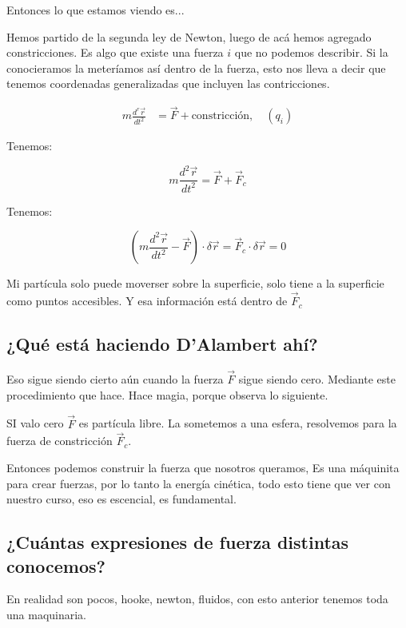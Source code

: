 \documentclass{article}
\begin{document}
Entonces lo que estamos viendo es...

Hemos partido de la segunda ley de Newton, luego de acá hemos agregado constricciones. Es algo que existe una fuerza $i$ que no podemos describir. Si la conocieramos la meteríamos así dentro de la fuerza, esto nos lleva a decir que tenemos coordenadas generalizadas que incluyen las contricciones.


\begin{equation}
\begin{split}
 m \frac{d^{r}\vec{r} }{dt^{2}} &= \vec{F} + \text{constricción}, \quad (q_{i})
\end{split}
\end{equation}


Tenemos:


\[ m \frac{d^{2} \vec{r} }{dt^{2}} = \vec{F} + \vec{F}_{c}   \]



Tenemos:


\[  \left( m \frac{ d^{2} \vec{r} }{dt^{2}} -\vec{F}  \right)  \cdot \delta{\vec{r}}  = \vec{F}_{c}\cdot \delta{\vec{r}} =0  \]



Mi partícula solo puede moverser sobre la superficie, solo tiene a la superficie como puntos accesibles. Y esa información está dentro de $\vec{F}_{c}$


\subsection{¿Qué está haciendo D'Alambert ahí?}

Eso sigue siendo cierto aún cuando la fuerza $\vec{F}$ sigue siendo cero. Mediante este procedimiento que hace. Hace magia, porque observa lo siguiente.


SI valo cero $\vec{F}$ es partícula libre. La sometemos a una esfera, resolvemos para la fuerza de constricción $\vec{F}_{c}$.

Entonces podemos construir la fuerza que nosotros queramos, Es una máquinita para crear fuerzas, por lo tanto la energía cinética, todo esto tiene que ver con nuestro curso, eso es escencial, es fundamental.


\subsection{¿Cuántas expresiones de fuerza distintas conocemos?}

En realidad son pocos, hooke, newton, fluidos, con esto anterior tenemos toda una maquinaria. 
\end{document}
